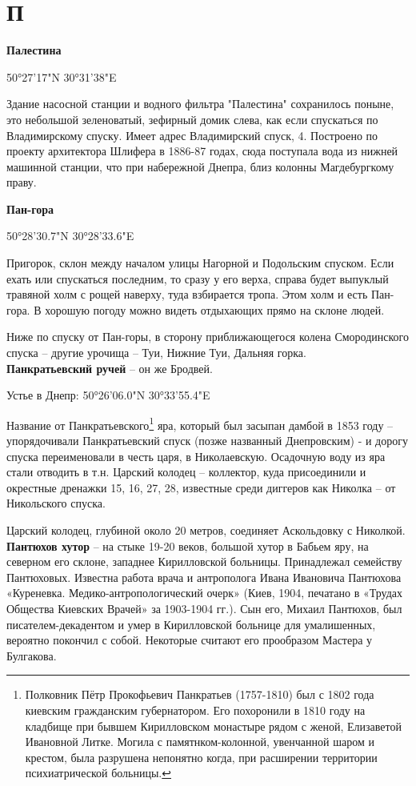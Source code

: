 \chapter*{П}

\textbf{Палестина}

50°27'17"N 30°31'38"E

Здание насосной станции и водного фильтра "Палестина" сохранилось поныне, это небольшой зеленоватый, зефирный домик слева, как если спускаться по Владимирскому спуску. Имеет адрес Владимирский спуск, 4. Построено по проекту архитектора Шлифера в 1886-87 годах, сюда поступала вода из нижней машинной станции, что при набережной Днепра, близ колонны Магдебургкому праву.

\textbf{Пан-гора}

50°28'30.7"N 30°28'33.6"E

Пригорок, склон между началом улицы Нагорной и Подольским спуском. Если ехать или спускаться последним, то сразу у его верха, справа будет выпуклый травяной холм с рощей наверху, туда взбирается тропа. Этом холм и есть Пан-гора. В хорошую погоду можно видеть отдыхающих прямо на склоне людей.

Ниже по спуску от Пан-горы, в сторону приближающегося колена Смородинского спуска – другие урочища – Туи, Нижние Туи, Дальняя горка.\\

\textbf{Панкратьевский ручей} – он же Бродвей.

Устье в Днепр: 50°26'06.0"N 30°33'55.4"E

Название от Панкратьевского\footnote{Полковник Пётр Прокофьевич Панкратьев (1757-1810) был с 1802 года киевским гражданским губернатором. Его похоронили в 1810 году на кладбище при бывшем Кирилловском монастыре рядом с женой, Елизаветой Ивановной Литке. Могила с памятнком-колонной, увенчанной шаром и крестом, была разрушена непонятно когда, при расширении территории психиатрической больницы.} яра, который был засыпан дамбой в 1853 году – упорядочивали Панкратьевский спуск (позже названный Днепровским) - и дорогу спуска переименовали в честь царя, в Николаевскую. Осадочную воду из яра стали отводить в т.н. Царский колодец – коллектор, куда присоединили и окрестные дренажки 15, 16, 27, 28, известные среди диггеров как Николка – от Никольского спуска.

Царский колодец, глубиной около 20 метров, соединяет Аскольдовку с Николкой.\\ 

\textbf{Пантюхов хутор} – на стыке 19-20 веков, большой хутор в Бабьем яру, на северном его склоне, западнее Кирилловской больницы. Принадлежал семейству Пантюховых. Известна работа врача и антрополога Ивана Ивановича Пантюхова «Куреневка. Медико-антропологи\-ческий очерк» (Киев, 1904, печатано в «Трудах Общества Киевских Врачей» за 1903-1904 гг.). Сын его, Михаил Пантюхов, был писателем-декадентом и умер в Кирилловской больнице для умалишенных, вероятно покончил с собой. Некоторые считают его прообразом Мастера у Булгакова.\\

